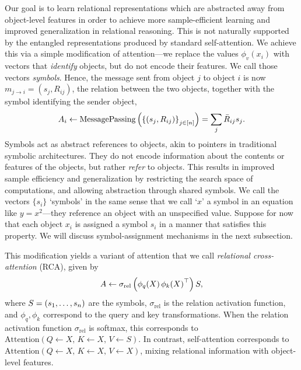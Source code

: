 Our goal is to learn relational representations which are abstracted away from object-level features in order to achieve more sample-efficient learning and improved generalization in relational reasoning. This is not naturally supported by the entangled representations produced by standard self-attention. We achieve this via a simple modification of attention---we replace the values $\phi_v(x_i)$ with vectors that \textit{identify} objects, but do not encode their features. We call those vectors \textit{symbols}. Hence, the message sent from object $j$ to object $i$ is now $m_{j \to i} = (s_j, R_{ij})$, the relation between the two objects, together with the symbol identifying the sender object,
\begin{equation}\label{eq:relational_crossattn_message_passing}
    A_i \gets \mathrm{MessagePassing}\left(\left\{(s_j, R_{ij})\right\}_{j \in [n]}\right) = \sum_{j} \bar{R}_{ij} s_j.
\end{equation}
Symbols act as abstract references to objects, akin to pointers in traditional symbolic architectures. They do not encode information about the contents or features of the objects, but rather \textit{refer} to objects.
This results in improved sample efficiency and generalization by restricting the search space of computations, and allowing abstraction through shared symbols.
We call the vectors $\{s_i\}$ `symbols' in the same sense that we call `$x$' a symbol in an equation like $y = x^2$---they reference an object with an unspecified value.
Suppose for now that each object $x_i$ is assigned a symbol $s_i$ in a manner that satisfies this property. We will discuss symbol-assignment mechanisms in the next subsection.

This modification yields a variant of attention that we call \textit{relational cross-attention} (RCA), given by
\begin{equation}\label{eq:relational_crossattn}
    A \gets  \sigma_{\mathrm{rel}}\left(\phi_q(X) \, {\phi_k(X)}^\top\right) S,
\end{equation}
where $S = (s_1, \ldots, s_n)$ are the symbols, $\sigma_{\mathrm{rel}}$ is the relation activation function, and $\phi_q, \phi_k$ correspond to the query and key transformations. When the relation activation function $\sigma_{\mathrm{rel}}$ is softmax, this corresponds to $\mathrm{Attention}(Q \gets X,\, K \gets X,\, V \gets S)$. In contrast, self-attention corresponds to $\mathrm{Attention}(Q \gets X,\, K \gets X,\, V \gets X)$, mixing relational information with object-level features.

